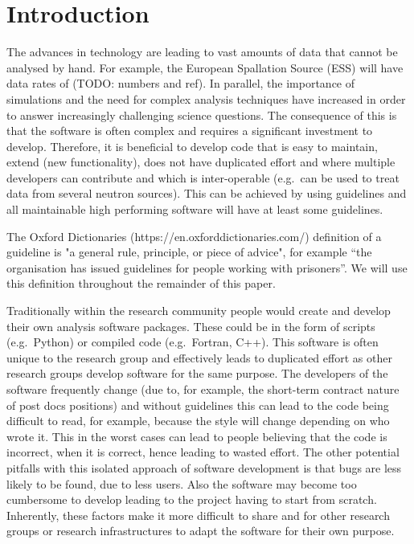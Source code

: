 \documentclass[jnr]{iosart2x}
\begin{document}

\section{Introduction}
\label{Introduction}

The advances in technology are leading to vast amounts of data that cannot be analysed by hand.
For example, the European Spallation Source (ESS) will have data rates of (TODO: numbers and ref).
In parallel, the importance of simulations and the need for complex analysis techniques have increased in order to answer increasingly challenging science questions.
The consequence of this is that the software is often complex and requires a significant investment to develop.
Therefore, it is beneficial to develop code that is easy to maintain, extend (new functionality), does not have duplicated effort and where multiple developers can contribute and which is inter-operable (e.g.\ can be used to treat data from several neutron sources). 
This can be achieved by using guidelines and all maintainable high performing software will have at least some guidelines.

The Oxford Dictionaries (https://en.oxforddictionaries.com/) definition of a guideline is "a general rule, principle, or piece of advice", for example “the organisation has issued guidelines for people working with prisoners”.
We will use this definition throughout the remainder of this paper.

Traditionally within the research community people would create and develop their own analysis software packages.
These could be in the form of scripts (e.g.\ Python) or compiled code (e.g.\ Fortran, C++).
This software is often unique to the research group and effectively leads to duplicated effort as other research groups develop software for the same purpose.
The developers of the software frequently change (due to, for example, the short-term contract nature of post docs positions) and without guidelines this can lead to the code being difficult to read, for example, because the style will change depending on who wrote it.
This in the worst cases can lead to people believing that the code is incorrect, when it is correct, hence leading to wasted effort.
The other potential pitfalls with this isolated approach of software development is that bugs are less likely to be found, due to less users.
Also the software may become too cumbersome to develop leading to the project having to start from scratch.
Inherently, these factors make it more difficult to share and for other research groups or research infrastructures to adapt the software for their own purpose.
\end{document}
